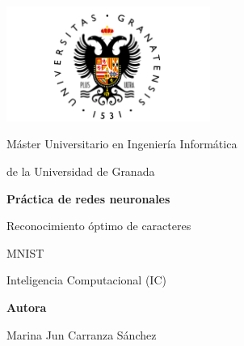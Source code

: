 \documentclass[12pt]{article}
\begin{document}
\begin{titlepage}
    \centering
    \begin{minipage}{1\textwidth}
    	\raisebox{-0.7\height}
    	{\includegraphics[width=0.5\textwidth]{UGR-Logo}}
    \end{minipage}
    
    \vspace{1.5cm}
    
    {\Large Máster Universitario en Ingeniería Informática
    	
    	de la Universidad de Granada \par}
    
    \vspace{1.5cm}
    
    {\Huge \textbf{Práctica de redes neuronales}
    	
    	\vspace{0.6cm}
    	
    	Reconocimiento óptimo de caracteres
    	
    	MNIST
    	\par}
    
    \vspace{1.5cm}
    
    {\LARGE {Inteligencia Computacional (IC)} \par}
    
    \vspace{1.5cm}
    
    \vfill
    
    {\Large \textbf{Autora} \par}
    {\Large Marina Jun Carranza Sánchez \par}
    \vspace{0.5cm}
    
\end{titlepage}
\end{document}
